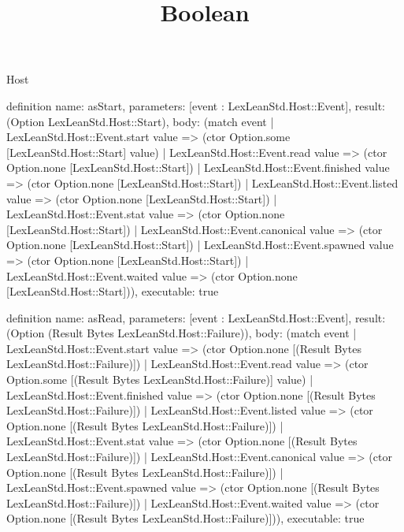 \begin{lexlean}{Host}
\title{Boolean}
\begin{semanticmodule}
definition{
  name: asStart,
  parameters: [event : LexLeanStd.Host::Event],
  result: (Option LexLeanStd.Host::Start),
  body: (match event
    | LexLeanStd.Host::Event.start value => (ctor Option.some [LexLeanStd.Host::Start] value)
    | LexLeanStd.Host::Event.read value => (ctor Option.none [LexLeanStd.Host::Start])
    | LexLeanStd.Host::Event.finished value => (ctor Option.none [LexLeanStd.Host::Start])
    | LexLeanStd.Host::Event.listed value => (ctor Option.none [LexLeanStd.Host::Start])
    | LexLeanStd.Host::Event.stat value => (ctor Option.none [LexLeanStd.Host::Start])
    | LexLeanStd.Host::Event.canonical value => (ctor Option.none [LexLeanStd.Host::Start])
    | LexLeanStd.Host::Event.spawned value => (ctor Option.none [LexLeanStd.Host::Start])
    | LexLeanStd.Host::Event.waited value => (ctor Option.none [LexLeanStd.Host::Start])),
  executable: true
}

definition{
  name: asRead,
  parameters: [event : LexLeanStd.Host::Event],
  result: (Option (Result Bytes LexLeanStd.Host::Failure)),
  body: (match event
    | LexLeanStd.Host::Event.start value => (ctor Option.none [(Result Bytes LexLeanStd.Host::Failure)])
    | LexLeanStd.Host::Event.read value => (ctor Option.some [(Result Bytes LexLeanStd.Host::Failure)] value)
    | LexLeanStd.Host::Event.finished value => (ctor Option.none [(Result Bytes LexLeanStd.Host::Failure)])
    | LexLeanStd.Host::Event.listed value => (ctor Option.none [(Result Bytes LexLeanStd.Host::Failure)])
    | LexLeanStd.Host::Event.stat value => (ctor Option.none [(Result Bytes LexLeanStd.Host::Failure)])
    | LexLeanStd.Host::Event.canonical value => (ctor Option.none [(Result Bytes LexLeanStd.Host::Failure)])
    | LexLeanStd.Host::Event.spawned value => (ctor Option.none [(Result Bytes LexLeanStd.Host::Failure)])
    | LexLeanStd.Host::Event.waited value => (ctor Option.none [(Result Bytes LexLeanStd.Host::Failure)])),
  executable: true
}


\end{semanticmodule}
\end{lexlean}

